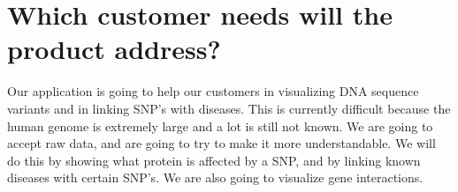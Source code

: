 \section{Which customer needs will the product address?}
Our application is going to help our customers in visualizing DNA sequence variants and in linking SNP's with diseases. This is currently difficult because the human genome is extremely large and a lot is still not known. We are going to accept raw data, and are going to try to make it more understandable. We will do this  by showing what protein is affected by a SNP, and by linking known diseases with certain SNP's. We are also going to visualize gene interactions. 